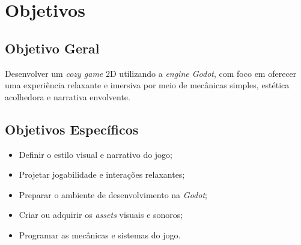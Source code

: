 \section{Objetivos}

\subsection{Objetivo Geral}

Desenvolver um \textit{cozy game} 2D utilizando a \textit{engine Godot}, com foco em oferecer uma experiência relaxante e imersiva por meio de mecânicas simples, estética acolhedora e narrativa envolvente.

\subsection{Objetivos Específicos}
\begin{itemize}
	\item Definir o estilo visual e narrativo do jogo;
	\item Projetar jogabilidade e interações relaxantes;
	\item Preparar o ambiente de desenvolvimento na \textit{Godot};
	\item Criar ou adquirir os \textit{assets} visuais e sonoros;
	\item Programar as mecânicas e sistemas do jogo.
	
\end{itemize}